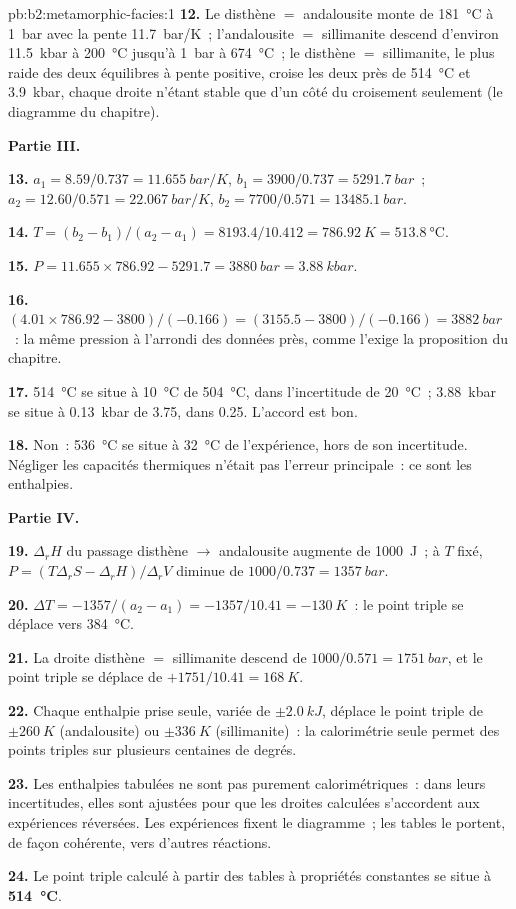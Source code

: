 \begin{solution}{pb:b2:metamorphic-facies:1}
\textbf{12.} Le disthène $=$ andalousite monte de \qty{181}{\celsius} à \qty{1}{bar} avec la
pente \qty{11.7}{bar/K}~; l'andalousite $=$ sillimanite descend d'environ \qty{11.5}{kbar} à \qty{200}{\celsius}
jusqu'à \qty{1}{bar} à \qty{674}{\celsius}~; le disthène $=$ sillimanite, le plus raide des deux équilibres à pente positive, croise les deux
près de \qty{514}{\celsius} et \qty{3.9}{kbar}, chaque droite n'étant stable que d'un côté
du croisement seulement (le diagramme du chapitre).

\noindent\textbf{Partie III.}

\textbf{13.} $a_1 = 8.59/0.737 = \qty{11.655}{bar/K}$, $b_1 = 3900/0.737 =
\qty{5291.7}{bar}$~; $a_2 = 12.60/0.571 = \qty{22.067}{bar/K}$, $b_2 = 7700/0.571 =
\qty{13485.1}{bar}$.

\textbf{14.} $T = (b_2 - b_1)/(a_2 - a_1) = 8193.4/10.412 = \qty{786.92}{K} =
\qty{513.8}{\celsius}$.

\textbf{15.} $P = 11.655\times786.92 - 5291.7 = \qty{3880}{bar} = \qty{3.88}{kbar}$.

\textbf{16.} $(4.01\times786.92 - 3800)/(-0.166) = (3155.5 - 3800)/(-0.166) =
\qty{3882}{bar}$~: la même pression à l'arrondi des données près, comme l'exige la proposition du chapitre.

\textbf{17.} \qty{514}{\celsius} se situe à \qty{10}{\celsius} de \qty{504}{\celsius}, dans
l'incertitude de \qty{20}{\celsius}~; \qty{3.88}{kbar} se situe à \qty{0.13}{kbar} de 3.75,
dans 0.25. L'accord est bon.

\textbf{18.} Non~: \qty{536}{\celsius} se situe à \qty{32}{\celsius} de l'expérience, hors de son
incertitude. Négliger les capacités thermiques n'était pas l'erreur principale~: ce sont les enthalpies.

\noindent\textbf{Partie IV.}

\textbf{19.} $\Delta_r H$ du passage disthène $\to$ andalousite augmente de \qty{1000}{J}~; à
$T$ fixé, $P = (T\Delta_r S - \Delta_r H)/\Delta_r V$ diminue de $1000/0.737 = \qty{1357}{bar}$.

\textbf{20.} $\Delta T = -1357/(a_2 - a_1) = -1357/10.41 = \qty{-130}{K}$~: le point triple
se déplace vers \qty{384}{\celsius}.

\textbf{21.} La droite disthène $=$ sillimanite descend de $1000/0.571 = \qty{1751}{bar}$, et
le point triple se déplace de $+1751/10.41 = \qty{+168}{K}$.

\textbf{22.} Chaque enthalpie prise seule, variée de $\pm\qty{2.0}{kJ}$, déplace le point triple de
$\pm\qty{260}{K}$ (andalousite) ou $\pm\qty{336}{K}$ (sillimanite)~: la calorimétrie seule permet des
points triples sur plusieurs centaines de degrés.

\textbf{23.} Les enthalpies tabulées ne sont pas purement calorimétriques~: dans leurs
incertitudes, elles sont ajustées pour que les droites calculées s'accordent aux expériences réversées.
Les expériences fixent le diagramme~; les tables le portent, de façon cohérente, vers d'autres réactions.

\textbf{24.} Le point triple calculé à partir des tables à propriétés constantes se situe à
\textbf{\qty[text-series-to-math=true]{514}{\celsius}}.
\end{solution}
